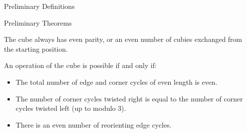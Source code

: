 \documentclass[final]{beamer}
\newlength{\colwidth}
\begin{document}
\begin{frame}[t]
\begin{columns}[t]
\begin{column}{\colwidth}
\begin{alertblock}{Preliminary Definitions}

  \end{alertblock}
 
  \begin{block}{Preliminary Theorems}

The cube always has even parity, or an even number of cubies
exchanged from the starting position.

      An operation of the cube is possible if and only if:
            \begin{itemize}
              \item The total number of edge and corner cycles of even length is even.
              \item The number of corner cycles twisted right is equal to the number of corner cycles twisted left (up to modulo $3$).
              \item There is an even number of reorienting edge cycles.








    \end{itemize}

  \end{block}
  


\end{column}


\end{columns}
\end{frame}
\end{document}
